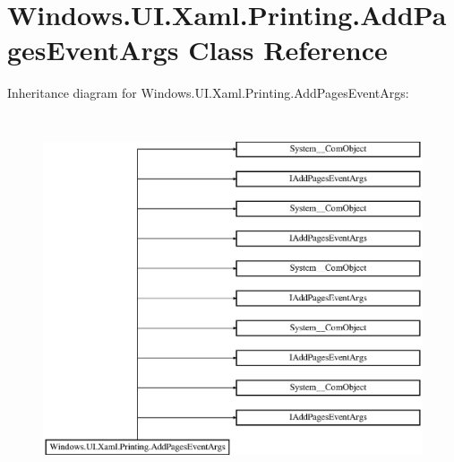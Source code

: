 \hypertarget{class_windows_1_1_u_i_1_1_xaml_1_1_printing_1_1_add_pages_event_args}{}\section{Windows.\+U\+I.\+Xaml.\+Printing.\+Add\+Pages\+Event\+Args Class Reference}
\label{class_windows_1_1_u_i_1_1_xaml_1_1_printing_1_1_add_pages_event_args}
Inheritance diagram for Windows.\+U\+I.\+Xaml.\+Printing.\+Add\+Pages\+Event\+Args\+:\begin{figure}[H]
\begin{center}
\leavevmode
\includegraphics[height=10.807017cm]{class_windows_1_1_u_i_1_1_xaml_1_1_printing_1_1_add_pages_event_args}
\end{center}
\end{figure}
